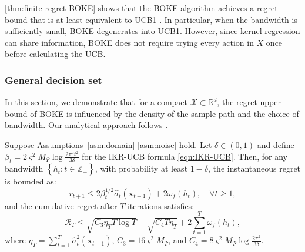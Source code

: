 \documentclass[11pt,en]{elegantpaper}
\newcommand{\domain}{\mathcal{X}}
\newcommand{\x}{\bm{x}}
\newcommand{\cumregret}{\mathcal{R}}
\newcommand{\1}{\mathds{1}}
\newcommand{\set}[1]{\left\{#1\right\}}
\begin{document}
\cref{thm:finite regret BOKE} shows that the BOKE algorithm achieves a regret bound that is at least equivalent to UCB1 \cite{auer2002finite}.
In particular, when the bandwidth is sufficiently small, BOKE degenerates into UCB1.
However, since kernel regression can share information, BOKE does not require trying every action in $X$ once before calculating the UCB.




\subsubsection{General decision set}

In this section, we demonstrate that for a compact $\domain \subset \mathbb{R}^d$, the regret upper bound of BOKE is influenced by the density of the sample path and the choice of bandwidth. Our analytical approach follows \cite{srinivas2010gaussian}.

\begin{theorem}
    \label{thm:general regret BOKE}
    Suppose Assumptions~\ref{asm:domain}-\ref{asm:noise} hold. Let $\delta \in (0, 1)$ and define $\beta_t = 2 \varsigma^2 M_{\Psi} \log \frac{2\pi^2 t^2}{3 \delta}$ for the IKR-UCB formula \eqref{eqn:IKR-UCB}.
    Then, for any bandwidth $\set{h_t : t \in \mathbb{Z}_+}$, with probability at least $1 - \delta$, the instantaneous regret is bounded as:
    \begin{equation}
        r_{t+1} \le 2 \beta_t^{1/2} \widehat{\sigma}_t(\x_{t+1}) + 2 \omega_f(h_t), \quad \forall t \ge 1,
    \end{equation}
    and the cumulative regret after $T$ iterations satisfies:
    \begin{equation}
        \cumregret_T \le \sqrt{C_3 \eta_T T \log T } + \sqrt{C_4 T \eta_T} + 2 \sum_{t=1}^{T} \omega_f(h_t),
    \end{equation}
    where $\eta_T = \sum_{t=1}^{T} \widehat{\sigma}_t^2(\x_{t+1})$, $C_3 = 16 \varsigma^2 M_{\Psi}$, and $C_4 = 8 \varsigma^2 M_{\Psi}\log \frac{2 \pi^2}{3 \delta}$.
\end{theorem}
\end{document}
